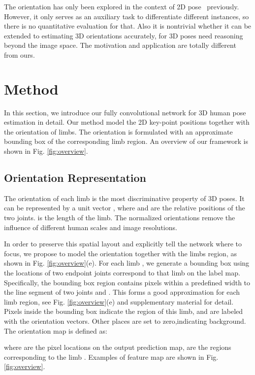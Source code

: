 \documentclass{bmvc2k}
\begin{document}
The orientation has only been explored in the context of 2D pose~\cite{cao2017realtime} previously. However, it only serves as an auxiliary task to differentiate different instances, so there is no quantitative evaluation for that. Also it is nontrivial whether it can be extended to estimating 3D orientations accurately, for 3D poses need reasoning beyond the image space. The motivation and application are totally different from ours. 


\section{Method}

In this section, we introduce our fully convolutional network for 3D human pose estimation in detail. Our method model the 2D key-point positions together with the orientation of limbs. The orientation is formulated with an approximate bounding box of the corresponding limb region. 
An overview of our framework is shown in Fig. \ref{fig:overview}. \subsection{Orientation Representation}
The orientation of each limb is the most discriminative property of 3D poses. It can be represented by a unit vector , 
where  and  are the relative positions of the two joints.
 is the length of the limb.
The normalized orientations remove the influence of different human scales and image resolutions.

In order to preserve this spatial layout and explicitly tell the network where to focus, we propose to model the orientation together with the limbs region, as shown in Fig. \ref{fig:overview}(e).
For each limb , we generate a bounding box using the locations of two endpoint joints correspond to that limb on the label map. 
Specifically, the bounding box region  contains pixels within a predefined width  to the line segment  of two joints  and . This forms a good approximation for each limb region, see Fig. \ref{fig:overview}(e) and supplementary material for detail.
Pixels inside the bounding box indicate the region of this limb, and are labeled with the orientation vectors.
Other places are set to zero,indicating background. The orientation map is defined as:

where  are the pixel locations on the output prediction map,
 are the regions corresponding to the limb . Examples of feature map are shown in Fig. \ref{fig:overview}.
\end{document}
